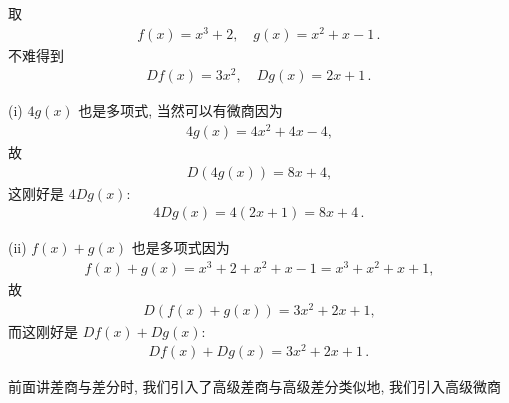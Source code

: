 \begin{example}
    取
    \begin{align*}
        f(x) = x^3 + 2, \quad g(x) = x^2 + x - 1 \period
    \end{align*}
    不难得到
    \begin{align*}
        Df (x) = 3x^2, \quad Dg (x) = 2x + 1 \period
    \end{align*}

    (i) $4g(x)$ 也是多项式, 当然可以有微商\period 因为
    \begin{align*}
        4g(x) = 4x^2 + 4x - 4,
    \end{align*}
    故
    \begin{align*}
        D(4g(x)) = 8x + 4,
    \end{align*}
    这刚好是 $4Dg(x)$:
    \begin{align*}
        4Dg(x) = 4(2x + 1) = 8x + 4 \period
    \end{align*}

    (ii) $f(x) + g(x)$ 也是多项式\period 因为
    \begin{align*}
        f(x) + g(x) = x^3 + 2 + x^2 + x - 1 = x^3 + x^2 + x + 1,
    \end{align*}
    故
    \begin{align*}
        D(f(x) + g(x)) = 3x^2 + 2x + 1,
    \end{align*}
    而这刚好是 $Df(x) + Dg(x)$:
    \begin{align*}
        Df(x) + Dg(x) = 3x^2 + 2x + 1 \period
    \end{align*}
\end{example}

前面讲差商与差分时, 我们引入了高级差商与高级差分\period 类似地, 我们引入高级微商\period

